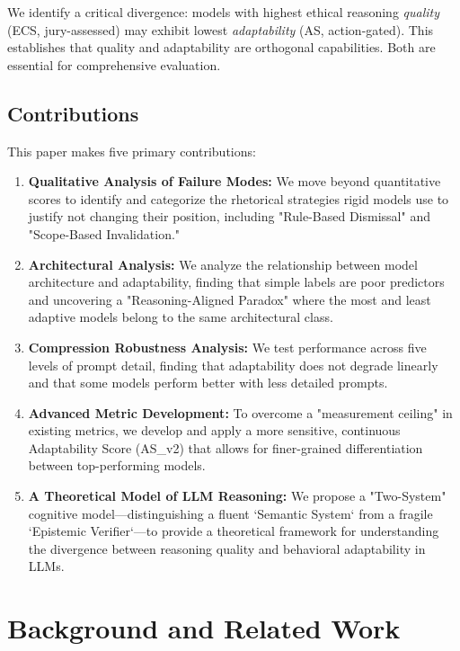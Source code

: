 \documentclass[11pt]{article}
\begin{document}
We identify a critical divergence: models with highest ethical reasoning \textit{quality} (ECS, jury-assessed) may exhibit lowest \textit{adaptability} (AS, action-gated). This establishes that quality and adaptability are orthogonal capabilities. Both are essential for comprehensive evaluation.

\subsection{Contributions}

This paper makes five primary contributions:
\begin{enumerate}
    \item \textbf{Qualitative Analysis of Failure Modes:} We move beyond quantitative scores to identify and categorize the rhetorical strategies rigid models use to justify not changing their position, including "Rule-Based Dismissal" and "Scope-Based Invalidation."

    \item \textbf{Architectural Analysis:} We analyze the relationship between model architecture and adaptability, finding that simple labels are poor predictors and uncovering a "Reasoning-Aligned Paradox" where the most and least adaptive models belong to the same architectural class.

    \item \textbf{Compression Robustness Analysis:} We test performance across five levels of prompt detail, finding that adaptability does not degrade linearly and that some models perform better with less detailed prompts.

    \item \textbf{Advanced Metric Development:} To overcome a "measurement ceiling" in existing metrics, we develop and apply a more sensitive, continuous Adaptability Score (AS\_v2) that allows for finer-grained differentiation between top-performing models.

    \item \textbf{A Theoretical Model of LLM Reasoning:} We propose a "Two-System" cognitive model—distinguishing a fluent `Semantic System` from a fragile `Epistemic Verifier`—to provide a theoretical framework for understanding the divergence between reasoning quality and behavioral adaptability in LLMs.
\end{enumerate}

\section{Background and Related Work}
\end{document}
